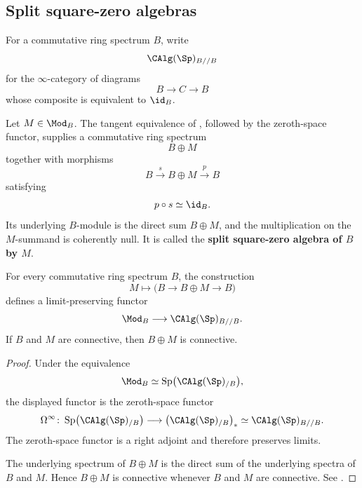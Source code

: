 \subsection{Split square-zero algebras}

\begin{construction}
\label{con:split-square-zero-algebra}
For a commutative ring spectrum \(B\), write
\[
    \CAlg(\Sp)_{B//B}
\]
for the \(\infty\)-category of diagrams
\[
    B
    \longrightarrow
    C
    \longrightarrow
    B
\]
whose composite is equivalent to \(\id_B\).

Let \(M\in\Mod_B\). The tangent equivalence of
, followed by the zeroth-space functor,
supplies a commutative ring spectrum
\[
    B\oplus M
\]
together with morphisms
\[
    B
    \xrightarrow{s}
    B\oplus M
    \xrightarrow{p}
    B
\]
satisfying
\[
    p\circ s
    \simeq
    \id_B.
\]
Its underlying \(B\)-module is the direct sum \(B\oplus M\), and the
multiplication on the \(M\)-summand is coherently null. It is called the
\textbf{split square-zero algebra of \(B\) by \(M\)}.
\end{construction}

\begin{proposition}
\label{prop:split-square-zero-functoriality}
For every commutative ring spectrum \(B\), the construction
\[
    M
    \longmapsto
    \bigl(
        B
        \longrightarrow
        B\oplus M
        \longrightarrow
        B
    \bigr)
\]
defines a limit-preserving functor
\[
    \Mod_B
    \longrightarrow
    \CAlg(\Sp)_{B//B}.
\]
If \(B\) and \(M\) are connective, then \(B\oplus M\) is connective.
\end{proposition}

\begin{proof}
Under the equivalence
\[
    \Mod_B
    \simeq
    \operatorname{Sp}
    \bigl(
        \CAlg(\Sp)_{/B}
    \bigr),
\]
the displayed functor is the zeroth-space functor
\[
    \Omega^\infty
    \colon
    \operatorname{Sp}
    \bigl(
        \CAlg(\Sp)_{/B}
    \bigr)
    \longrightarrow
    \bigl(
        \CAlg(\Sp)_{/B}
    \bigr)_*
    \simeq
    \CAlg(\Sp)_{B//B}.
\]
The zeroth-space functor is a right adjoint and therefore preserves
limits.

The underlying spectrum of \(B\oplus M\) is the direct sum of the
underlying spectra of \(B\) and \(M\). Hence \(B\oplus M\) is connective
whenever \(B\) and \(M\) are connective. See
\cite[Remark~7.3.4.15]{LurieHigherAlgebra}.
\end{proof}

